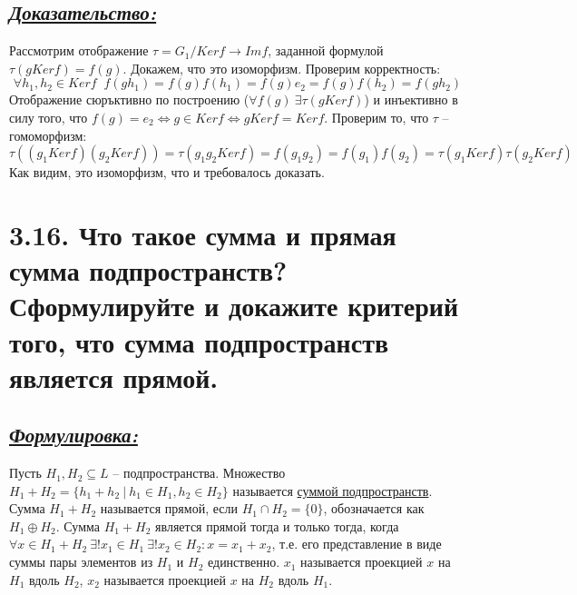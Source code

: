 \documentclass{article}
\begin{document}
\subsection*{\Large \underline{\textit{Доказательство: }}}

Рассмотрим отображение $\tau = G_1 / Kerf \rightarrow Imf$, заданной формулой $\tau(gKerf) = f(g)$. Докажем, что это изоморфизм.
\newline Проверим корректность:
$$ \forall h_1, h_2 \in Kerf \;\; f(gh_1) = f(g)f(h_1) = f(g)e_2 = f(g)f(h_2) = f(gh_2) $$
Отображение сюръктивно по построению ($\forall f(g) \: \exists \tau(gKerf)$) и инъективно в силу того, что $f(g) = e_2 \Leftrightarrow g\in Kerf \Leftrightarrow gKerf = Kerf$.
\newline Проверим то, что $\tau$ -- гомоморфизм:
$$
\tau((g_1Kerf)(g_2Kerf)) = \tau(g_1g_2Kerf) = f(g_1g_2) = f(g_1)f(g_2) = \tau(g_1Kerf)\tau(g_2Kerf)
$$
Как видим, это изоморфизм, что и требовалось доказать.

\section*{\LARGE 3.16. Что такое сумма и прямая сумма подпространств? Сформулируйте и докажите критерий того, что сумма подпространств является прямой. }
\subsection*{\Large \underline{\textit{Формулировка: }}}
Пусть $H_1, H_2 \subseteq L$ -- подпространства. Множество $H_1 + H_2 = \{h_1 + h_2 \:|\: h_1 \in H_1, h_2 \in H_2\}$ называется \underline{суммой подпространств}.
\newline Сумма $H_1 + H_2$ называется прямой, если $H_1 \cap H_2 = \{0\}$, обозначается как $H_1 \oplus H_2$.
\newline Сумма $H_1 + H_2$ является прямой тогда и только тогда, когда 
\newline $\forall x \in H_1 + H_2 \: \exists!x_1 \in H_1 \: \exists!x_2 \in H_2 : x = x_1 + x_2$, т.е. его представление в виде суммы пары элементов из $H_1$ и $H_2$ единственно. $x_1$ называется проекцией $x$ на $H_1$ вдоль $H_2$, $x_2$ называется проекцией $x$ на $H_2$ вдоль $H_1$.
\end{document}
